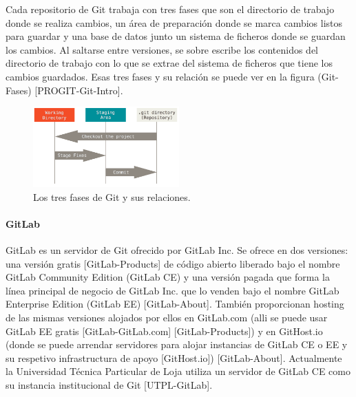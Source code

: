 Cada repositorio de Git trabaja con tres fases que son el directorio de trabajo donde se realiza cambios, un área de preparación donde se marca cambios listos para guardar y una base de datos junto un sistema de ficheros donde se guardan los cambios. Al saltarse entre versiones, se sobre escribe los contenidos del directorio de trabajo con lo que se extrae del sistema de ficheros que tiene los cambios guardados. Esas tres fases y su relación se puede ver en la figura (Git-Fases) [PROGIT-Git-Intro].

\begin{figure}
  \begin{center}
      \includegraphics[width=0.5\textwidth]{Figures/git-fases.png}
  \end{center}
  \caption{Los tres fases de Git y sus relaciones.} 
  \label{Git-Fases}
\end{figure}

\paragraph{GitLab}
GitLab es un servidor de Git ofrecido por GitLab Inc. Se ofrece en dos versiones: una versión gratis [GitLab-Products] de código abierto liberado bajo el nombre GitLab Community Edition (GitLab CE) y una versión pagada que forma la línea principal de negocio de GitLab Inc. que lo venden bajo el nombre GitLab Enterprise Edition (GitLab EE) [GitLab-About]. También proporcionan hosting de las mismas versiones alojados por ellos en GitLab.com (alli se puede usar GitLab EE gratis [GitLab-GitLab.com] [GitLab-Products]) y en GitHost.io (donde se puede arrendar servidores para alojar instancias de GitLab CE o EE y su respetivo infrastructura de apoyo [GitHost.io]) [GitLab-About]. Actualmente la Universidad Técnica Particular de Loja utiliza un servidor de GitLab CE como su instancia institucional de Git [UTPL-GitLab].

